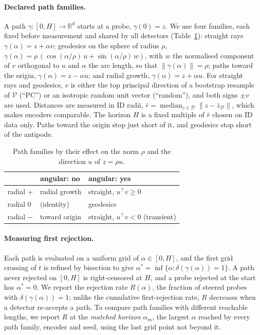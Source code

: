 \documentclass[twoside]{article}
\theoremstyle{definition}
\theoremstyle{remark}
\newcommand{\R}{\mathbb{R}}
\begin{document}
\paragraph{Declared path families.}
A path $\gamma:[0,H]\to\R^d$ starts at a probe, $\gamma(0)=z$. We use four families, each fixed before
measurement and shared by all detectors (Table~\ref{tab:polar}): straight rays $\gamma(\alpha)=z+\alpha v$;
geodesics on the sphere of radius $\rho$, $\gamma(\alpha)=\rho\,(\cos(\alpha/\rho)\,u+\sin(\alpha/\rho)\,w)$,
with $w$ the normalised component of $v$ orthogonal to $u$ and $\alpha$ the arc length, so that
$\|\gamma(\alpha)\|=\rho$; paths toward the origin, $\gamma(\alpha)=z-\alpha u$; and radial growth,
$\gamma(\alpha)=z+\alpha u$. For straight rays and geodesics, $v$ is either the top principal direction of a
bootstrap resample of $\mathcal{V}$ (``PC'') or an isotropic random unit vector (``random''), and both signs
$\pm v$ are used. Distances are measured in ID radii,
$\bar r=\operatorname{median}_{z\in\mathcal{D}}\|z-\bar z_{\mathcal{D}}\|$, which makes encoders
comparable. The horizon $H$ is a fixed multiple of $\bar r$ chosen on ID data only. Paths toward the origin
stop just short of it, and geodesics stop short of the antipode.

\begin{table}[t]
\centering\small
\caption{Path families by their effect on the norm $\rho$ and the direction $u$ of $z=\rho u$.}
\label{tab:polar}
\begin{tabular}{lll}
\toprule
 & angular: no & angular: yes \\
\midrule
radial $+$ & radial growth & straight, $u^\top v\ge 0$ \\
radial $0$ & (identity) & geodesics \\
radial $-$ & toward origin & straight, $u^\top v<0$ (transient) \\
\bottomrule
\end{tabular}
\end{table}

\paragraph{Measuring first rejection.}
Each path is evaluated on a uniform grid of $\alpha\in[0,H]$, and the first grid crossing of $t$ is refined
by bisection to give $\alpha^*=\inf\{\alpha:\delta(\gamma(\alpha))=1\}$. A path never rejected on $[0,H]$ is
right-censored at $H$, and a probe rejected at the start has $\alpha^*=0$. We report the rejection rate
$R(\alpha)$, the fraction of steered probes with $\delta(\gamma(\alpha))=1$; unlike the cumulative
first-rejection rate, $R$ decreases when a detector re-accepts a path. To compare path families with
different reachable lengths, we report $R$ at the \emph{matched horizon} $\alpha_m$, the largest $\alpha$
reached by every path family, encoder and seed, using the last grid point not beyond it.
\end{document}

